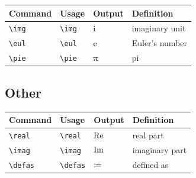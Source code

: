 \documentclass[11pt]{article}
\begin{document}
\begin{tabular}{llll}
    Command     & Usage       & Output & Definition     \\
    \hline
    \verb|\img| & \verb|\img| & $\mathrm{i}$ & imaginary unit \\
    \verb|\eul| & \verb|\eul| & $\mathrm{e}$ & Euler's number \\
    \verb|\pie| & \verb|\pie| & $\uppi$ & pi             \\
\end{tabular}

\subsection{Other}

\begin{tabular}{llll}
    Command        & Usage                 & Output           & Definition          \\
    \hline
    \verb|\real|   & \verb|\real|          & $\operatorname{Re}$          & real part           \\
    \verb|\imag|   & \verb|\imag|          & $\operatorname{Im}$          & imaginary part      \\
    \verb|\defas|  & \verb|\defas|         & $\coloneq$         & defined as          \\
\end{tabular}
\end{document}
